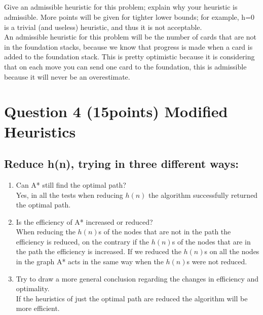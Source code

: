 \documentclass{article}
\def\ans#1{{\color{ans}#1}}
\begin{document}
\subsection{}
Give  an  admissible  heuristic for  this  problem;  explain  why  your  heuristic  is  admissible. More points will be given for tighter lower bounds; for example, h=0 is a trivial (and useless) heuristic, and thus it is not acceptable. \\
\ans{
    An admissible heuristic for this problem will be the number of cards that are not in the foundation 
    stacks, because we know that progress is made when a card is added to the foundation stack.
    This is pretty optimistic because it is considering that on each move you can send one card to the 
    foundation, this is admissible because it will never be an overestimate.
}



\clearpage
\section{Question 4 (15points) Modified Heuristics}

\subsection{Reduce h(n), trying in three different ways:}
\begin{enumerate}[label=(\alph*)]
    \item Can A* still find the optimal path? \\
    \ans{
        Yes, in all the tests when reducing $h(n)$ the algorithm successfully returned the optimal path.
    }
    \item Is the efficiency of A* increased or reduced? \\
    \ans{
        When reducing the $h(n)$s of the nodes that are not in the path the efficiency is reduced, on 
        the contrary if the $h(n)$s of the nodes that are in the path the efficiency is increased. If 
        we reduced the $h(n)$s on all the nodes in the graph A* acts in the same way when the $h(n)$s 
        were not reduced.
    }
    \item Try to draw a more general conclusion regarding the changes in efficiency and optimality. \\
    \ans{
        If the heuristics of just the optimal path are reduced the algorithm will be more efficient.
    }
\end{enumerate}
\end{document}
